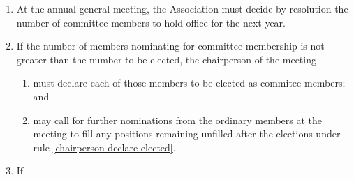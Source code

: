 \documentclass[../constitution.tex]{subfiles}
\begin{document}
\begin{enumerate}
\begin{enumerate}
          \item If a position for which a nominee was removed under this rule remains unfilled after subrules \ref{nominating-committee-less-than-elected} and \ref{nominating-committee-more-than-elected} are applied, that position is taken to be a casual vacancy for the purposes of rule \ref{filling-casual-vacancies}.
          \item The chairperson may decline to accept a motion under subrule \ref{raise-no-confidence-motion} if the chairperson considers it to be frivolous, vexatious, or dilatory. A member may move that the chairperson's decision under this subrule be overruled; that motion must be put to the meeting immediately and is carried by a majority of the ordinary members present and voting.
          \item A motion of no confidence must not be moved against the same nominee more than once at the same meeting.
        \end{enumerate}

  \item At the annual general meeting, the Association must decide by resolution the number of committee members to hold office for the next year. \label{decide-number-of-committee-members}


  \item If the number of members nominating for committee membership is not greater than the number to be elected, the chairperson of the meeting --- \label{nominating-committee-less-than-elected}

        \begin{enumerate}

          \item must declare each of those members to be elected as commitee members; and \label{chairperson-declare-elected}
          \item may call for further nominations from the ordinary members at the meeting to fill any positions remaining unfilled after the elections under rule \ref{chairperson-declare-elected}. \label{further-nominations-for-unfilled}
        \end{enumerate}
  \item If --- \label{nominating-committee-more-than-elected}

        \begin{enumerate}


\end{enumerate}
\end{enumerate}
\end{document}
